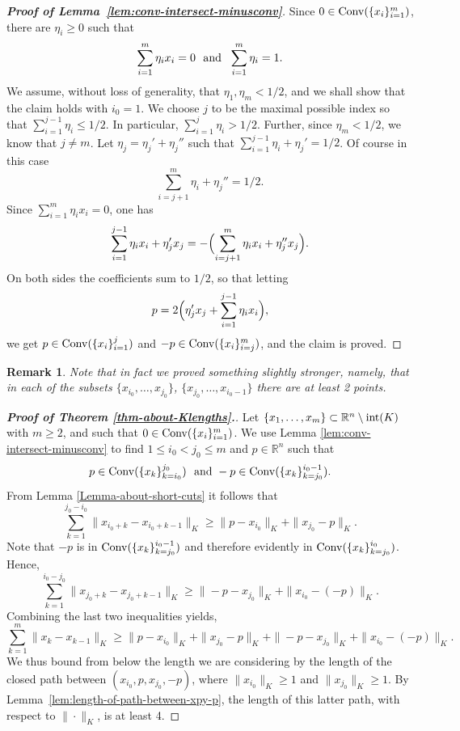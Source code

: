 \documentclass[11pt]{article}
\def\conv{{\rm Conv}}
\def\RR{\mathbb{R}}
\newtheorem{remark}[lemma]{Remark}
\begin{document}
{\begin{proof}[{\bf Proof of Lemma~\ref{lem:conv-intersect-minusconv}}] Since $0 \in
{\rm Conv}(\{x_i\}_{i=1}^{m})$,
there are $\eta_i \ge 0$ such that
\begin{equation} \label{uniquepres} \sum_{i=1}^{m} \eta_i x_i =
0 \ \  {\rm and} \ \ \sum_{i=1}^{m} \eta_i = 1.
\end{equation} 
We assume, without loss of generality, that $\eta_1,\eta_m < 1/2$, and we shall show that the claim holds with 
$i_0=1$. 
We choose $j$ to be the maximal
possible index so that  $ \sum_{i=1}^{j-1}\eta_{i}\le 1/2$. 
In particular, $ \sum_{i=1}^{j}\eta_{i}> 1/2$.
Further, since $\eta_m <1/2$, we know that $j\neq m$. 
Let $\eta_j = \eta_j'+\eta_j''$ such that $ \sum_{i=1}^{j-1}\eta_{i} + \eta_j' = 1/2$. 
Of course in this case  \[ \sum_{i=j+1}^{m}\eta_{i} + \eta_j'' = 1/2.\] 
Since $\sum_{i=1}^{m} \eta_i x_i =
0$, one has  
\[  \sum_{i=1}^{j-1} \eta_i x_i + \eta_j'x_j = -\Bigl ( \sum_{i=j+1}^{m} \eta_i x_i + \eta_j''x_j \Bigr).  \] 
On both sides the coefficients  sum to $1/2$, so that letting 
\[ p = 2 \Bigl (  \eta_j'x_j  + \sum_{i=1}^{j-1} \eta_i x_i  \Bigr ), \]
we get $p\in \conv (\{x_i\}_{i=1}^{j})$ and $-p \in \conv(\{x_i\}_{i=j}^m)$, and the claim is proved.
\end{proof} 

\begin{remark}
{\rm Note that in fact we proved something slightly stronger, namely, that in each of the subsets $\{x_{i_0}, \ldots ,x_{j_0}\}$, $\{x_{j_0},\ldots,x_{i_0-1}\}$ there are at least 2 points. } \end{remark} 

\begin{proof}[{\bf Proof of Theorem \ref{thm-about-Klengths}.}]
Let $\{x_1,\ldots,x_{m}\}\subset \RR^n\setminus {\rm int}(K)$ with $m\ge 2$, and such that $0 \in {\rm Conv} (\{x_i\}_{i=1}^{m})$. 
We use Lemma \ref{lem:conv-intersect-minusconv} to find $1\le i_0< j_0\le m $ and $p\in \RR^n$ such that 
\[ p\in \conv ( \{ x_k \}_{k=i_0}^{j_0} ) \  \  {\rm and} \  -p \in \conv ( \{x_k\}_{k=j_0}^{i_0-1}). \] 
From Lemma \ref{Lemma-about-short-cuts}  it follows that
$$\sum_{k=1}^{j_0-i_0} \|x_{i_0+k}-x_{i_0+k-1}\|_K \geq \|p-x_{i_0} \|_K+\|x_{j_0}-p\|_K.$$
Note that $-p$ is in ${\rm Conv} (\{x_k \}_{k=j_0}^{i_0-1})$  and therefore evidently in  ${\rm Conv} ( \{x_k\}_{k=j_0}^{i_0})$. Hence, 
$$\sum_{k=1}^{i_0-j_0} \|x_{{j_0}+k}-x_{j_0+k-1}\|_K \geq \|-p-x_{j_0}\|_K+\|x_{i_0}-(-p)\|_K.$$
Combining the last two inequalities yields, 
\[ \sum_{k=1}^{m} \|x_{k}-x_{k-1}\|_K \geq \|p-x_{i_0} \|_K+\|x_{j_0}-p\|_K+\|-p-x_{j_0} \|_K+\|x_{i_0}-(-p)\|_K.\]
We thus bound from below the length we are considering by the length of the closed path between $(x_{i_0},p,x_{j_0},-p)$, where $\|x_{i_0} \|_K\ge 1$ and $\|x_{j_0}\|_K\ge 1$. 
By Lemma~\ref{lem:length-of-path-between-xpy-p}, the length of this latter path, with respect to $\| \cdot \|_K$,  is at least 4. 
 

\end{proof}}
\end{document}
